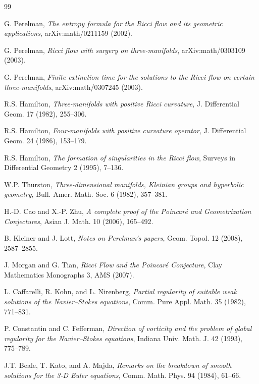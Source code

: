 \documentclass[11pt]{article}
\begin{document}
\begin{thebibliography}{99}

G. Perelman, \emph{The entropy formula for the Ricci flow and its
geometric applications}, arXiv:math/0211159 (2002).

G. Perelman, \emph{Ricci flow with surgery on three-manifolds},
arXiv:math/0303109 (2003).

G. Perelman, \emph{Finite extinction time for the solutions to the
Ricci flow on certain three-manifolds}, arXiv:math/0307245 (2003).

R.S. Hamilton, \emph{Three-manifolds with positive Ricci curvature},
J. Differential Geom. 17 (1982), 255--306.

R.S. Hamilton, \emph{Four-manifolds with positive curvature operator},
J. Differential Geom. 24 (1986), 153--179.

R.S. Hamilton, \emph{The formation of singularities in the Ricci flow},
Surveys in Differential Geometry 2 (1995), 7--136.

W.P. Thurston, \emph{Three-dimensional manifolds, Kleinian groups and
hyperbolic geometry}, Bull. Amer. Math. Soc. 6 (1982), 357--381.

H.-D. Cao and X.-P. Zhu, \emph{A complete proof of the Poincar\'e
and Geometrization Conjectures}, Asian J. Math. 10 (2006), 165--492.

B. Kleiner and J. Lott, \emph{Notes on Perelman's papers},
Geom. Topol. 12 (2008), 2587--2855.

J. Morgan and G. Tian, \emph{Ricci Flow and the Poincar\'e Conjecture},
Clay Mathematics Monographs 3, AMS (2007).

L. Caffarelli, R. Kohn, and L. Nirenberg, \emph{Partial regularity of
suitable weak solutions of the Navier--Stokes equations},
Comm. Pure Appl. Math. 35 (1982), 771--831.

P. Constantin and C. Fefferman, \emph{Direction of vorticity and the
problem of global regularity for the Navier--Stokes equations},
Indiana Univ. Math. J. 42 (1993), 775--789.

J.T. Beale, T. Kato, and A. Majda, \emph{Remarks on the breakdown
of smooth solutions for the 3-D Euler equations},
Comm. Math. Phys. 94 (1984), 61--66.


\end{thebibliography}
\end{document}
